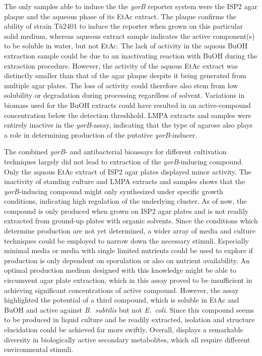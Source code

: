 The only samples able to induce the the \emph{yorB} reporter system were the ISP2 agar plaque and the aqueous phase of its EtAc extract.
The plaque confirms the ability of strain Tü2401 to induce the reporter when grown on this particular solid medium, whereas aqueous extract sample indicates the active component(s) to be soluble in water, but not EtAc.
The lack of activity in the aquous BuOH extraction sample could be due to an inactivating reaction with BuOH during the extraction procedure.
However, the activity of the aquous EtAc extract was distinctly smaller than that of the agar plaque despite it being generated from multiple agar plates.
The loss of activity could therefore also stem from low solubility or degradation during processing regardless of solvent.
Variations in biomass used for the BuOH extracts could have resulted in an active-compound concentration below the detection threshhold.
LMPA extracts and samples were entirely inactive in the \emph{yorB}-assay, indicating that the type of agarose also plays a role in determining production of the putative \emph{yorB}-inducer.

The combined \emph{yorB}- and antibacterial bioassays for different cultivation techniques largely did not lead to extraction of the \emph{yorB}-inducing compound.
Only the aquous EtAc extract of ISP2 agar plates displayed minor activity.
The inactivity of standing culture and LMPA extracts and samples shows that the \emph{yorB}-inducing compound might only synthesized under specific growth conditions, indicating high regulation of the underlying cluster.
As of now, the compound is only produced when grown on ISP2 agar plates and is not readily extracted from ground-up plates with organic solvents.
Since the conditions which determine production are not yet determined, a wider array of media and culture techniques could be employed to narrow down the necessary stimuli.
Especially minimal media or media with single limited nutrients could be used to explore if production is only dependent on sporulation or also on nutrient availability.
An optimal production medium designed with this knowledge might be able to circumvent agar plate extraction, which in this assay proved to be insufficient in achieving significant concentrations of active compound.
However, the assay highlighted the potential of a third compound, which is soluble in EtAc and BuOH and active against \emph{B.~subtilis} but not \emph{E.~coli}.
Since this compound seems to be produced in liquid culture and be readily extracted, isolation and structure elucidation could be achieved far more swiftly.
Overall, \tue{} displays a remarkable diversity in biologically active secondary metabolites, which all require different environmental stimuli.

